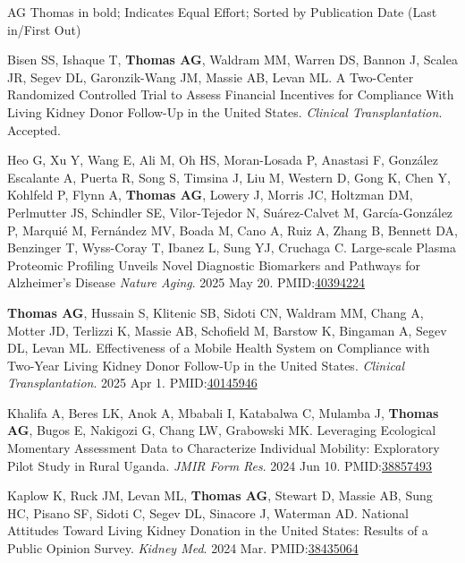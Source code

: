 \documentclass[10pt]{article}
\makeatletter
\newlength{\bibhang}
\newlength{\bibsep}
 {\@listi \global\bibsep\itemsep \global\advance\bibsep by\parsep}
\newenvironment{bibenum*}
  {\renewcommand\labelenumi{[\theenumi]}%
   \etaremune[
     topsep=0pt,
     itemsep=\bibsep,
     parsep=0pt,partopsep=0pt,
     itemindent=-\bibhang,
     leftmargin={\bibhang+\widthof{[999]}}]}
  {\endetaremune}
\newcommand{\pmid}[1]{PMID:\href{https://www.ncbi.nlm.nih.gov/pubmed/#1}{#1}}
\makeatother
\begin{document}
  AG Thomas in bold; \textbf{\dag} Indicates Equal Effort;
  Sorted by Publication Date (Last in/First Out)

\vspace{2mm}

\begin{bibenum*}

\item Bisen SS, Ishaque T, \textbf{Thomas AG}, Waldram MM, Warren DS, Bannon J, 
  Scalea JR, Segev DL, Garonzik-Wang JM, Massie AB, Levan ML. 
  A Two-Center Randomized Controlled Trial to Assess Financial Incentives
  for Compliance With Living Kidney Donor Follow-Up in the United States.
  \emph{Clinical Transplantation}. Accepted.

\item Heo G, Xu Y, Wang E, Ali M, Oh HS, Moran-Losada P, Anastasi F, 
  González Escalante A, Puerta R, Song S, Timsina J, Liu M, Western D, Gong K,
  Chen Y, Kohlfeld P, Flynn A, \textbf{Thomas AG}, Lowery J, Morris JC, Holtzman DM,
  Perlmutter JS, Schindler SE, Vilor-Tejedor N, Suárez-Calvet M,
  García-González P, Marquié M, Fernández MV, Boada M, Cano A, Ruiz A,
  Zhang B, Bennett DA, Benzinger T, Wyss-Coray T, Ibanez L, Sung YJ, Cruchaga C.
  Large-scale Plasma Proteomic Profiling Unveils Novel Diagnostic
  Biomarkers and Pathways for Alzheimer's Disease
  \emph{Nature Aging}. 2025 May 20.
  \pmid{40394224} 

\item \textbf{Thomas AG}, Hussain S, Klitenic SB, Sidoti CN, Waldram MM,
  Chang A, Motter JD, Terlizzi K, Massie AB, Schofield M, Barstow K,
  Bingaman A, Segev DL, Levan ML. 
  Effectiveness of a Mobile Health System on Compliance with 
  Two-Year Living Kidney Donor Follow-Up in the United States.
  \emph{Clinical Transplantation}. 2025 Apr 1.
  \pmid{40145946} 

\item Khalifa A, Beres LK, Anok A, Mbabali I, Katabalwa C, Mulamba J, 
  \textbf{Thomas AG}, Bugos E, Nakigozi G, Chang LW, Grabowski MK.
  Leveraging Ecological Momentary Assessment Data to Characterize Individual 
  Mobility: Exploratory Pilot Study in Rural Uganda. 
  \emph{JMIR Form Res}. 2024 Jun 10.
  \pmid{38857493} 

\item Kaplow K, Ruck JM, Levan ML, \textbf{Thomas AG}, Stewart D, Massie AB, 
  Sung HC, Pisano SF, Sidoti C, Segev DL, Sinacore J, Waterman AD. 
  National Attitudes Toward Living Kidney Donation in the United States: 
  Results of a Public Opinion Survey. 
  \emph{Kidney Med}. 2024 Mar.
  \pmid{38435064} 


\end{bibenum*}
\end{document}
